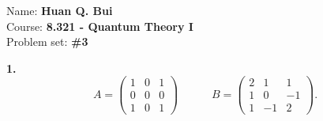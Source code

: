 \documentclass{article}
\theoremstyle{definition}
\begin{document}
\begin{framed}
\noindent Name: \textbf{Huan Q. Bui}\\
Course: \textbf{8.321 - Quantum Theory I}\\
Problem set: \textbf{\#3}
\end{framed}
	




\noindent \textbf{1. }
\begin{equation*}
A = \begin{pmatrix}
1 & 0 & 1\\
0 & 0 & 0\\
1 & 0 & 1
\end{pmatrix} 
\quad\quad \quad 
B = \begin{pmatrix}
2 & 1 & 1 \\
1 & 0 & -1\\
1 & -1 & 2
\end{pmatrix}.
\end{equation*}
\end{document}

